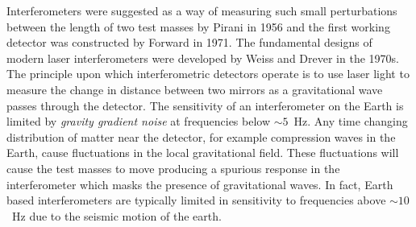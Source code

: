 Interferometers were suggested as a way of measuring such small perturbations
between the length of two test masses by Pirani in 1956\cite{Pirani:1956} and
the first working detector was constructed by Forward in
1971\cite{Forward:1971}. The fundamental designs of modern laser
interferometers were developed by Weiss\cite{Weiss:1972} and
Drever\cite{Drever:1980} in the 1970s. The principle upon which
interferometric detectors operate is to use laser light to measure the change
in distance between two mirrors as a gravitational wave passes through the
detector.  The sensitivity of an interferometer on the Earth is limited by
\emph{gravity gradient noise} at frequencies below $\sim
5$~Hz\cite{Saulson:1994}.  Any time changing distribution of matter near the
detector, for example compression waves in the Earth, cause fluctuations in
the local gravitational field. These fluctuations will cause the test masses
to move producing a spurious response in the interferometer which masks the
presence of gravitational waves. In fact, Earth based interferometers are
typically limited in sensitivity to frequencies above $\sim 10$~Hz due to the
seismic motion of the earth.


